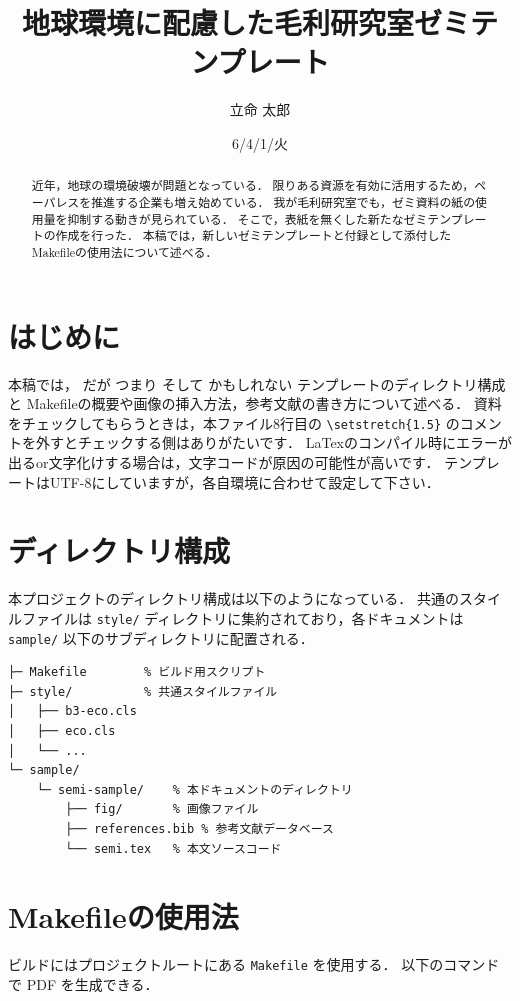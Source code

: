 \documentclass[submit,techreq,noauthor,dvipdfmx]{eco}
\begin{document}
\date   {6/4/1/火}				%
\title  {地球環境に配慮した毛利研究室ゼミテンプレート}	%
\author {立命 太郎}				%


\begin{abstract}
	近年，地球の環境破壊が問題となっている．
	限りある資源を有効に活用するため，ペーパレスを推進する企業も増え始めている．
	我が毛利研究室でも，ゼミ資料の紙の使用量を抑制する動きが見られている．
	そこで，表紙を無くした新たなゼミテンプレートの作成を行った．
	本稿では，新しいゼミテンプレートと付録として添付したMakefileの使用法について述べる．
\end{abstract}
\maketitle

\section{はじめに}
本稿では，
だが
つまり
そして
かもしれない
テンプレートのディレクトリ構成と
Makefileの概要や画像の挿入方法，参考文献の書き方について述べる．
資料をチェックしてもらうときは，本ファイル8行目の
\verb|\setstretch{1.5}|
のコメントを外すとチェックする側はありがたいです．
LaTexのコンパイル時にエラーが出るor文字化けする場合は，文字コードが原因の可能性が高いです．
テンプレートはUTF-8にしていますが，各自環境に合わせて設定して下さい．


\section{ディレクトリ構成}
本プロジェクトのディレクトリ構成は以下のようになっている．
共通のスタイルファイルは \texttt{style/} ディレクトリに集約されており，各ドキュメントは \texttt{sample/} 以下のサブディレクトリに配置される．

\begin{lstlisting}
├─ Makefile        % ビルド用スクリプト
├─ style/          % 共通スタイルファイル
│   ├── b3-eco.cls
│   ├── eco.cls
│   └── ...
└─ sample/
    └─ semi-sample/    % 本ドキュメントのディレクトリ
        ├── fig/       % 画像ファイル
        ├── references.bib % 参考文献データベース
        └── semi.tex   % 本文ソースコード
\end{lstlisting}

\section{Makefileの使用法}
ビルドにはプロジェクトルートにある \texttt{Makefile} を使用する．
以下のコマンドで PDF を生成できる．
\end{document}
